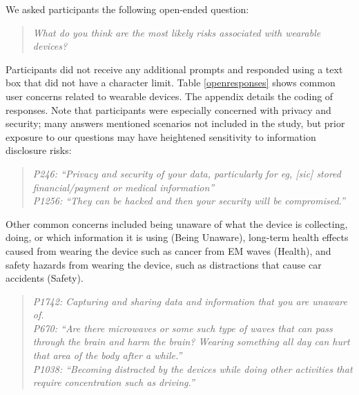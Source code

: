 \documentclass[conference]{IEEEtran}
\begin{document}
We asked participants the following open-ended question:

\begin{quotation}
\noindent
\textit{What do you think are the most likely risks associated with wearable devices?}\\
\end{quotation}

Participants did not receive any additional prompts and responded using a text box that did not have a character limit. Table \ref{openresponses} shows common user concerns related to wearable devices. The appendix details the coding of responses. Note that participants were especially concerned with privacy and security; many answers mentioned scenarios not included in the study, but prior exposure to our questions may have heightened sensitivity to information disclosure risks:\\

\begin{quotation}
\noindent
\textit{P246: ``Privacy and security of your data, particularly for eg, [sic] stored financial/payment or medical information''}\\

\noindent
\textit{P1256: ``They can be hacked and then your security will be compromised.''}
\end{quotation}

Other common concerns included being unaware of what the device is collecting, doing, or which information it is using (Being Unaware), long-term health effects caused from wearing the device such as cancer from EM waves (Health), and safety hazards from wearing the device, such as distractions that cause car accidents (Safety).

\begin{quotation}
\noindent
\textit{P1742: Capturing and sharing data and information that you are unaware of.}\\

\noindent
\textit{P670: ``Are there microwaves or some such type of waves that can pass through the brain and harm the brain?  Wearing something all day can hurt that area of the body after a while.''}\\

\noindent
\textit{P1038: ``Becoming distracted by the devices while doing other activities that require concentration such as driving.''}

\end{quotation}
\end{document}
